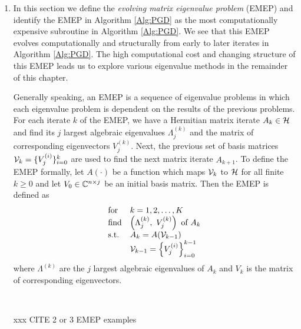 \begin{enumerate}




\item


In this section we define the \textit{evolving matrix eigenvalue problem} (EMEP) and identify the EMEP in Algorithm \ref{Alg:PGD} as the most computationally expensive subroutine in Algorithm \ref{Alg:PGD}.  We see that this EMEP evolves computationally and structurally from early to later iterates in Algorithm \ref{Alg:PGD}.  The high computational cost and changing structure of this EMEP leads us to explore various eigenvalue methods in the remainder of this chapter.


Generally speaking, an EMEP is a sequence of eigenvalue problems in which each eigenvalue problem is dependent on the results of the previous problems.  For each iterate $k$ of the EMEP, we have a Hermitian matrix iterate $A_k \in {\mathcal H}$ and find its $j$ largest algebraic eigenvalues $\Lambda^{(k)}_j$ and the matrix of corresponding eigenvectors $V^{(k)}_j$.   Next, the previous set of basis matrices ${\mathcal V}_{k} = \{ V^{(i)}_j \}_{i=0}^{k}$ are used to find the next matrix iterate $A_{k+1}$.  To define the EMEP formally, let $A(\cdot)$ be a function which maps ${\mathcal V}_{k}$ to ${\mathcal H}$ for all finite $k \geq 0$ and let $V_0 \in {\mathbb C}^{n \times j}$ be an initial basis matrix. Then the EMEP is defined as 
\begin{equation} 		\label{Eqn:EMEP_general}
\begin{array}{ll}
\textnormal{for}
	&	k = 1, 2, \ldots, K		\\
\textnormal{find}	
	&	\left( \Lambda^{(k)}_j, \ V^{(k)}_j \right) \textnormal{ of } A_k
		\\
\textnormal{s.t.}
	&	A_{k} = A({\mathcal V}_{k-1})
		\\
	&	{\mathcal V}_{k-1} = \left\{ V^{(i)}_j \right\}_{i=0}^{k-1}
\end{array}
\end{equation}
where $\Lambda^{(k)}$ are the $j$ largest algebraic eigenvalues of $A_k$ and $V_k$ is the matrix of corresponding eigenvectors.


\


xxx CITE 2 or 3 EMEP examples

\






\end{enumerate}
